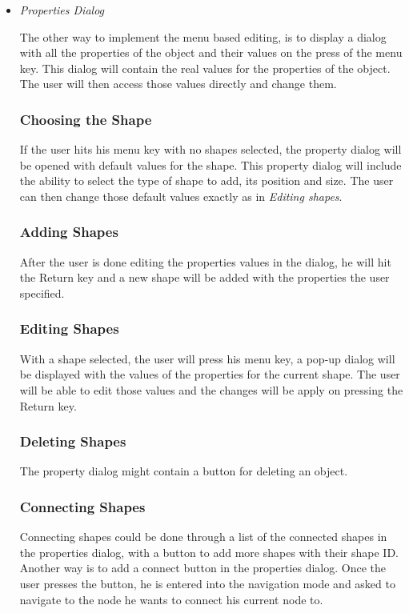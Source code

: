 \begin{itemize}
\item {\it Properties Dialog}
\par \noindent
The other way to implement the menu based editing, is to display a dialog with all the properties of the object and their values on the press of the menu key. This dialog will contain the real values for the properties of the object. The user will then access those values directly and change them.

	\subsubsection {Choosing the Shape}
	If the user hits his menu key with no shapes selected, the property dialog will be opened with default values for the shape. This property dialog will include the ability to select the type of shape to add, its position and size. The user can then change those default values exactly as in {\it Editing shapes}.

	\subsubsection {Adding Shapes}
	After the user is done editing the properties values in the dialog, he will hit the Return key and a new shape will be added with the properties the user specified.

	\subsubsection {Editing Shapes}
	With a shape selected, the user will press his menu key, a pop-up dialog will be displayed with the values of the properties for the current shape. The user will be able to edit those values and the changes will be apply on pressing the Return key.

	\subsubsection {Deleting Shapes}
	The property dialog might contain a button for deleting an object.

	\subsubsection {Connecting Shapes}
	Connecting shapes could be done through a list of the connected shapes in the properties dialog, with a button to add more shapes with their shape ID. Another way is to add a connect button in the properties dialog. Once the user presses the button, he is entered into the navigation mode and asked to navigate to the node he wants to connect his current node to.

\end{itemize}

